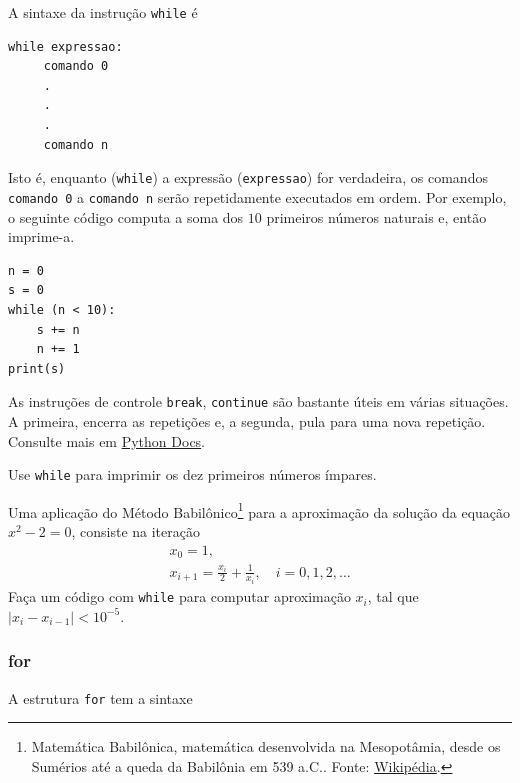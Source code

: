 \documentclass[12pt]{article}
\begin{document}
A sintaxe da instrução \lstinline+while+ é

\begin{lstlisting}
while expressao:
     comando 0
     .
     .
     .
     comando n
\end{lstlisting}

Isto é, enquanto (\lstinline+while+) a expressão (\lstinline+expressao+) for verdadeira, os comandos 
\lstinline+comando 0+ a \lstinline+comando n+ serão repetidamente executados em ordem. Por exemplo, o seguinte código computa a soma dos $10$ primeiros números naturais e, então imprime-a.

\begin{lstlisting}
n = 0
s = 0
while (n < 10):
    s += n
    n += 1
print(s)
\end{lstlisting}

\begin{obs}
  As instruções de controle \lstinline+break+, \lstinline+continue+ são bastante úteis em várias situações. A primeira, encerra as repetições e, a segunda, pula para uma nova repetição. Consulte mais em \href{https://docs.python.org/3/tutorial/controlflow.html\#break-and-continue-statements-and-else-clauses-on-loops}{Python Docs}.
\end{obs}

\begin{exr}
  Use \lstinline+while+ para imprimir os dez primeiros números ímpares.
\end{exr}

\begin{exr}
  Uma aplicação do Método Babilônico\footnote{Matemática Babilônica, matemática desenvolvida na Mesopotâmia, desde os Sumérios até a queda da Babilônia em 539 a.C.. Fonte: \href{https://pt.wikipedia.org/wiki/Matem\%C3\%A1tica\_babil\%C3\%B4nica}{Wikipédia}.} para a aproximação da solução da equação $x^2-2 = 0$, consiste na iteração
  \begin{gather}
    x_0 = 1,\\
    x_{i+1} = \frac{x_i}{2} + \frac{1}{x_i},\quad i=0,1,2,\ldots
  \end{gather}
  Faça um código com \lstinline+while+ para computar aproximação $x_{i}$, tal que $|x_{i}-x_{i-1}|<10^{-5}$.
\end{exr}

\subsubsection{for}

A estrutura \lstinline+for+ tem a sintaxe
\end{document}
